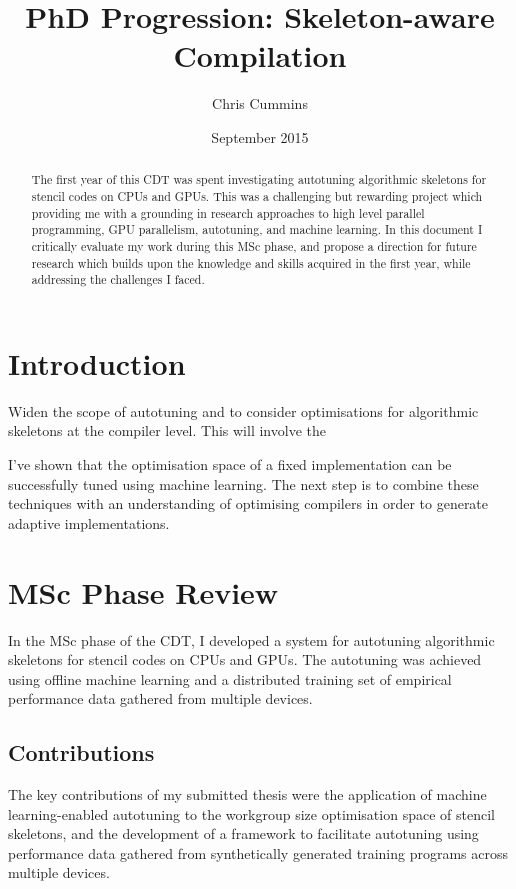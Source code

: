 \documentclass[11pt]{article}
\author{Chris Cummins}
\date{September 2015}
\title{PhD Progression: Skeleton-aware Compilation}
\begin{document}
\maketitle

\begin{abstract}
\noindent
The first year of this CDT was spent investigating autotuning
algorithmic skeletons for stencil codes on CPUs and GPUs. This was a
challenging but rewarding project which providing me with a grounding
in research approaches to high level parallel programming, GPU
parallelism, autotuning, and machine learning. In this document I
critically evaluate my work during this MSc phase, and propose a
direction for future research which builds upon the knowledge and
skills acquired in the first year, while addressing the challenges I
faced.
\end{abstract}

\section{Introduction}

Widen the scope of autotuning and to consider optimisations for
algorithmic skeletons at the compiler level. This will involve the

I’ve shown that the optimisation space of a fixed implementation can
be successfully tuned using machine learning. The next step is to
combine these techniques with an understanding of optimising compilers
in order to generate adaptive implementations.

\section{MSc Phase Review}

In the MSc phase of the CDT, I developed a system for autotuning
algorithmic skeletons for stencil codes on CPUs and GPUs. The
autotuning was achieved using offline machine learning and a
distributed training set of empirical performance data gathered from
multiple devices.


\subsection{Contributions}


The key contributions of my submitted thesis were the application of
machine learning-enabled autotuning to the workgroup size optimisation
space of stencil skeletons, and the development of a framework to
facilitate autotuning using performance data gathered from
synthetically generated training programs across multiple devices.
\end{document}
